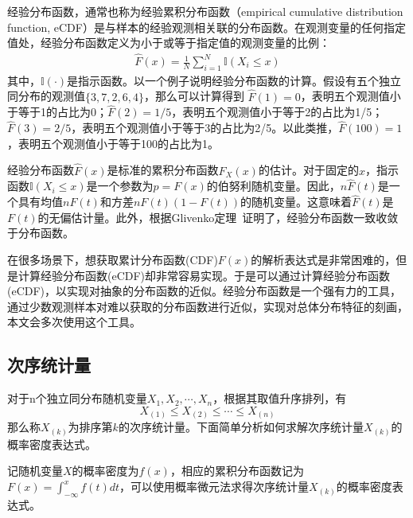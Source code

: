 经验分布函数，通常也称为经验累积分布函数（empirical cumulative distribution function, eCDF）是与样本的经验观测相关联的分布函数。在观测变量的任何指定值处，经验分布函数定义为小于或等于指定值的观测变量的比例：
\begin{eqnarray}
\hat F(x) = \frac{1}{N}\sum_{i=1}^{N} \mathbb I (X_i\leq x)
\end{eqnarray}
其中，$\mathbb I(\cdot)$是指示函数。以一个例子说明经验分布函数的计算。假设有五个独立同分布的观测值$\{3,7,2,6,4\}$，那么可以计算得到 $\hat F(1) = 0$，表明五个观测值小于等于1的占比为0；$\hat F(2) = 1/5$，表明五个观测值小于等于2的占比为1/5；$\hat F(3) = 2/5$，表明五个观测值小于等于3的占比为2/5。以此类推，$\hat F(100) = 1$，表明五个观测值小于等于100的占比为1。


经验分布函数$\hat F(x)$是标准的累积分布函数$ F_{X}(x)$的估计\cite{mou:2006}。对于固定的$x$，指示函数${\displaystyle \mathbb {I}({X_{i}\leq x})}$是一个参数为$p=F(x)$的伯努利随机变量。因此，${\displaystyle n{\widehat {F}}(t)}$是一个具有均值$nF(t)$和方差$nF(t)(1-F(t))$的随机变量。这意味着$\hat F(t)$是$F(t)$的无偏估计量。此外，根据Glivenko定理~\cite{glivenko:1933}证明了，经验分布函数一致收敛于分布函数。

在很多场景下，想获取累计分布函数(CDF)$F(x)$的解析表达式是非常困难的，但是计算经验分布函数(eCDF)却非常容易实现。于是可以通过计算经验分布函数(eCDF)，以实现对抽象的分布函数的近似。经验分布函数是一个强有力的工具，通过少数观测样本对难以获取的分布函数进行近似，实现对总体分布特征的刻画，本文会多次使用这个工具。

\subsection{次序统计量}
对于n个独立同分布随机变量$X_1, X_2, \cdots, X_n$，根据其取值升序排列，有
\[X_{(1)} \leq X_{(2)} \leq \cdots \leq X_{(n)} \]
那么称$X_{(k)}$为排序第$k$的次序统计量\cite{David:2004}。下面简单分析如何求解次序统计量$X_{(k)}$的概率密度表达式。

记随机变量$X$的概率密度为$f(x)$，相应的累积分布函数记为$F(x) = \int_{ - \infty }^x f(t)dt$，可以使用概率微元法\cite{mou:2006}求得次序统计量$X_{(k)}$的概率密度表达式。

